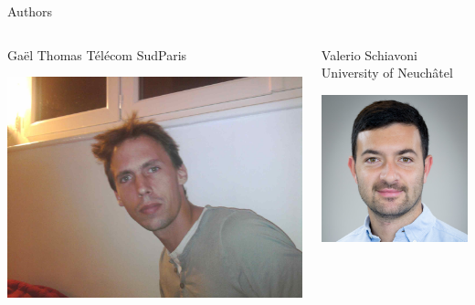 \documentclass[presentation]{beamer}
\begin{document}
\begin{frame}[label={sec:org103b257}]{Authors}
\begin{block}{}
\begin{columns}
\begin{column}{0.2\columnwidth}
\begin{block}{Gaël Thomas}
Télécom SudParis\\
\begin{center}
\includegraphics[width=.9\linewidth]{./IMGs/gael.jpg}
\end{center}
\end{block}
\end{column}

\begin{column}{0.2\columnwidth}
\begin{block}{Valerio Schiavoni}
University of Neuchâtel\\
\begin{center}
\includegraphics[width=.9\linewidth]{./IMGs/valerio.jpg}
\end{center}
\end{block}
\end{column}
\end{columns}
\end{block}
\end{frame}
\end{document}

